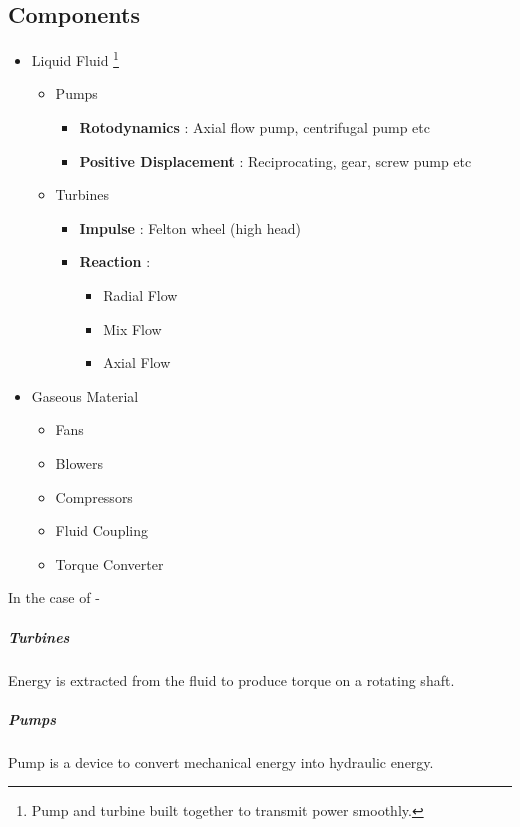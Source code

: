 \documentclass{article}
\begin{document}
\subsection*{Components}
\begin{itemize}[label=$\circ$]
    \item Liquid Fluid \footnote{Pump and turbine built together to transmit power smoothly.}
    \begin{itemize}[label=\textendash]
        \item Pumps
        \begin{itemize}[label=\textbullet]
            \item \textbf{Rotodynamics} : Axial flow pump, centrifugal pump etc
            \item \textbf{Positive Displacement} : Reciprocating, gear, screw pump etc
        \end{itemize}
        \item Turbines
        \begin{itemize}[label=\textbullet]
            \item \textbf{Impulse} : Felton wheel (high head)
            \item \textbf{Reaction} : 
            \begin{itemize}[label=\textasteriskcentered]
            		\item Radial Flow
            		\item Mix Flow
            		\item Axial Flow
            \end{itemize}
        \end{itemize}
    \end{itemize}
    \item Gaseous Material
    		\begin{itemize}
    			\item Fans
    			\item Blowers
    			\item Compressors
    			\item Fluid Coupling
    			\item Torque Converter 
    		\end{itemize}
\end{itemize}
\vspace{1cm}
In the case of - 
\subparagraph{Turbines}
Energy is extracted from the fluid to produce torque on a rotating shaft.
\subparagraph{Pumps}
Pump is a device to convert mechanical energy into hydraulic energy.
\\
\end{document}
